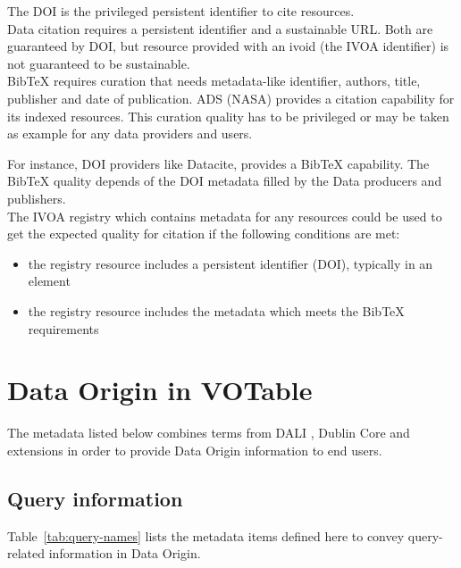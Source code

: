 \documentclass[11pt,a4paper]{ivoa}
\begin{document}
The DOI is the privileged persistent identifier to cite resources.\\

Data citation requires a persistent identifier and a sustainable URL.
Both are guaranteed by DOI, but resource provided with an ivoid (the IVOA identifier)
is not guaranteed to be sustainable.\\

BibTeX requires curation that needs metadata-like identifier, authors, title, publisher and date of publication.
ADS (NASA) provides a citation capability for its indexed resources. This curation quality has to be privileged or may be taken as example for any data providers and users.

For instance, DOI providers like Datacite, provides a BibTeX capability. The BibTeX quality depends of the DOI metadata filled by the Data producers and publishers.\\

The IVOA registry which contains metadata for any resources could be used to get the expected quality for citation if the following conditions are met:
\begin{itemize}
\item the registry resource includes a persistent identifier (DOI), typically in an  element
\item the registry resource includes the metadata which meets the BibTeX requirements
\end{itemize}



\section{Data Origin in VOTable}
\label{sec:data-origin-in-votable}
The metadata listed below combines terms from DALI \citep{2017ivoa.spec.0517D}, Dublin Core \citep{std:DUBLINCORE} and extensions in order to provide Data Origin information to end users.

\subsection{Query information}
Table~\ref{tab:query-names} lists the metadata items defined here to
convey query-related information in Data Origin.
\end{document}
